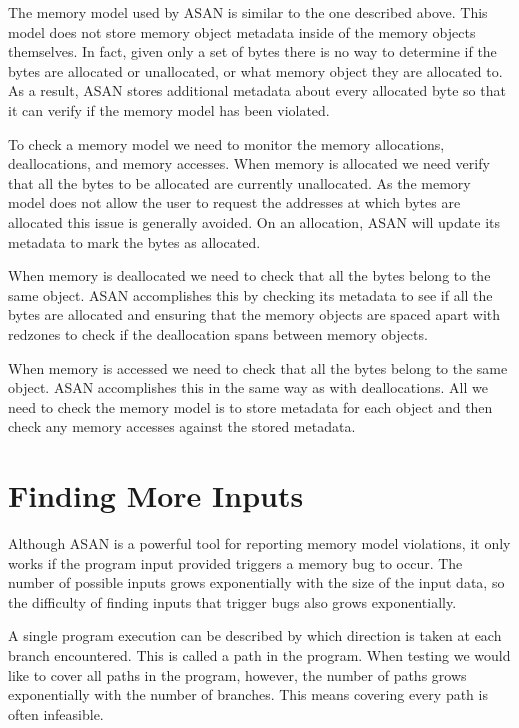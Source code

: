 \documentclass[12pt,twoside]{report}
\begin{document}
The memory model used by ASAN is similar to the one described above. This model does not store memory object metadata inside of the memory objects themselves. In fact, given only a set of bytes there is no way to determine if the bytes are allocated or unallocated, or what memory object they are allocated to. As a result, ASAN stores additional metadata about every allocated byte so that it can verify if the memory model has been violated.

To check a memory model we need to monitor the memory allocations, deallocations, and memory accesses. When memory is allocated we need verify that all the bytes to be allocated are currently unallocated. As the memory model does not allow the user to request the addresses at which bytes are allocated this issue is generally avoided. On an allocation, ASAN will update its metadata to mark the bytes as allocated.

When memory is deallocated we need to check that all the bytes belong to the same object. ASAN accomplishes this by checking its metadata to see if all the bytes are allocated and ensuring that the memory objects are spaced apart with redzones to check if the deallocation spans between memory objects.

When memory is accessed we need to check that all the bytes belong to the same object. ASAN accomplishes this in the same way as with deallocations. All we need to check the memory model is to store metadata for each object and then check any memory accesses against the stored metadata.

\section{Finding More Inputs}
Although ASAN is a powerful tool for reporting memory model violations, it only works if the program input provided triggers a memory bug to occur. The number of possible inputs grows exponentially with the size of the input data, so the difficulty of finding inputs that trigger bugs also grows exponentially.

A single program execution can be described by which direction is taken at each branch encountered. This is called a path in the program. When testing we would like to cover all paths in the program, however, the number of paths grows exponentially with the number of branches. This means covering every path is often infeasible.
\end{document}
